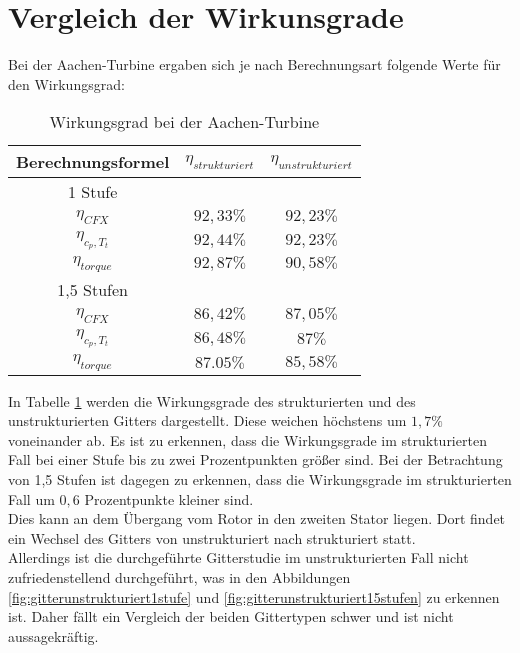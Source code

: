 \section{Vergleich der Wirkunsgrade}
Bei der Aachen-Turbine ergaben sich je nach Berechnungsart folgende Werte für den Wirkungsgrad:
\begin{table}[H]
	\centering
	\caption{Wirkungsgrad bei der Aachen-Turbine}
	\begin{tabular}{ c| c | c}
Berechnungsformel	&	$\eta_{strukturiert}$	&	$\eta_{unstrukturiert}$	\\
\hline
1 Stufe	&		&		\\
\hline
$\eta_{CFX}$	&	$92,33\%$	&	$92,23\%$	\\
$\eta_{c_p, T_t}$	&	$92,44\%$	&	$92,23\%$	\\
$\eta_{torque}$	&	$92,87\%$	&	$90,58\%$	\\
\hline
1,5 Stufen 	&		&		\\
\hline
$\eta_{CFX}$	&	$86,42\%$	&	$87,05\%$	\\
$\eta_{c_p, T_t}$	&	$86,48\%$	&	$87\%$	\\
$\eta_{torque}$	&	$87.05\%$	&	$85,58\%$	\\

	\end{tabular}
	\label{tab:wgaachen}
\end{table}
In Tabelle \ref{tab:wgaachen} werden die Wirkungsgrade des strukturierten und des unstrukturierten Gitters dargestellt. Diese weichen höchstens um $1,7\%$ voneinander ab. Es ist zu erkennen, dass die Wirkungsgrade im strukturierten Fall bei einer Stufe bis zu zwei Prozentpunkten größer sind. Bei der Betrachtung von 1,5 Stufen ist dagegen zu erkennen, dass die Wirkungsgrade im strukturierten Fall um $0,6$ Prozentpunkte kleiner sind.\\
Dies kann an dem Übergang vom Rotor in den zweiten Stator liegen. Dort findet ein Wechsel des Gitters von unstrukturiert nach strukturiert statt.\\
Allerdings ist die durchgeführte Gitterstudie im unstrukturierten Fall nicht zufriedenstellend durchgeführt, was in den Abbildungen \ref{fig:gitterunstrukturiert1stufe} und \ref{fig:gitterunstrukturiert15stufen} zu erkennen ist. Daher fällt ein Vergleich der beiden Gittertypen schwer und ist nicht aussagekräftig. \\ 

